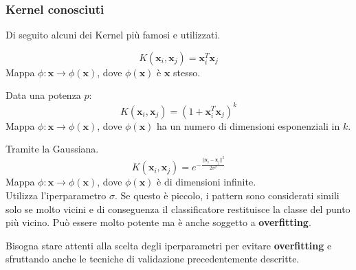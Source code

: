 \subsubsection{Kernel conosciuti}
Di seguito alcuni dei Kernel più famosi e utilizzati.
\begin{definition}[Lineare]
	\begin{equation}
		K(\mathbf{x}_i, \mathbf{x}_j) = \mathbf{x}_i^T \mathbf{x}_j
	\end{equation}
	Mappa $\phi: \mathbf{x}\to \phi(\mathbf{x})$, dove $\phi(\mathbf{x})$ è $\mathbf{x}$ stesso.
\end{definition}

\begin{definition}[Polinomiale]
	Data una potenza $p$:
	\begin{equation}
		K(\mathbf{x}_i, \mathbf{x}_j) = (1+\mathbf{x}_i^T \mathbf{x}_j)^k
	\end{equation}
	Mappa $\phi: \mathbf{x}\to \phi(\mathbf{x})$, dove $\phi(\mathbf{x})$ ha un numero di dimensioni esponenziali in $k$.
\end{definition}

\begin{definition}
	Tramite la Gaussiana.
	\begin{equation}
		K(\mathbf{x}_i, \mathbf{x}_j) = e^{-\frac{\lvert\lvert \mathbf{x}_i - \mathbf{x}_j\rvert \rvert^2}{2\sigma^2}}
	\end{equation}
	Mappa $\phi: \mathbf{x}\to \phi(\mathbf{x})$, dove $\phi(\mathbf{x})$ è di dimensioni infinite. \\
	Utilizza l'iperparametro $\sigma$. Se questo è piccolo, i pattern sono considerati simili solo se molto vicini e di conseguenza il classificatore restituisce la classe del punto più vicino. Può essere molto potente ma è anche soggetto a \textbf{overfitting}.
\end{definition}

\begin{observation}
	Bisogna stare attenti alla scelta degli iperparametri per evitare \textbf{overfitting} e sfruttando anche le tecniche di validazione precedentemente descritte.
\end{observation}